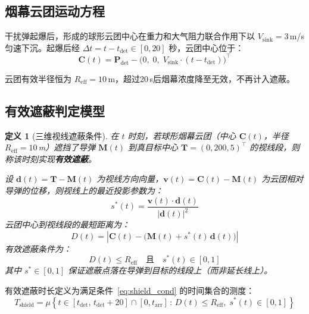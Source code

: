 \documentclass[12pt, a4paper]{article}
\newtheorem{definition}{定义}
\begin{document}
\subsection{烟幕云团运动方程}

干扰弹起爆后，形成的球形云团中心在重力和大气阻力联合作用下以 $V_{\mathrm{sink}}=3$\,m/s 匀速下沉。起爆后经 $\Delta t = t - t_{\mathrm{det}} \in [0,20]$ 秒，云团中心位于：
\begin{equation}
\boldsymbol{C}(t) = \boldsymbol{P}_{\mathrm{det}} - \big(0,\;0,\;V_{\mathrm{sink}}\cdot(t-t_{\mathrm{det}})\big)^{\top}
\label{eq:cloud}
\end{equation}

云团有效半径恒为 $R_{\mathrm{eff}}=10$\,m，超过20\,s后烟幕浓度降至无效，不再计入遮蔽。

\subsection{有效遮蔽判定模型}

\begin{definition}[三维视线遮蔽条件]
在 $t$ 时刻，若球形烟幕云团（中心 $\boldsymbol{C}(t)$，半径 $R_{\mathrm{eff}}=10$\,m）遮挡了导弹 $\boldsymbol{M}(t)$ 到真目标中心 $\boldsymbol{T}=(0,200,5)^{\top}$ 的视线段，则称该时刻实现\textbf{有效遮蔽}。

设 $\boldsymbol{d}(t) = \boldsymbol{T} - \boldsymbol{M}(t)$ 为视线方向向量，$\boldsymbol{v}(t) = \boldsymbol{C}(t) - \boldsymbol{M}(t)$ 为云团相对导弹的位移，则视线上的最近投影参数为：
\begin{equation}
s^*(t) = \frac{\boldsymbol{v}(t) \cdot \boldsymbol{d}(t)}{|\boldsymbol{d}(t)|^2}
\end{equation}
云团中心到视线段的最短距离为：
\begin{equation}
D(t) = \left|\boldsymbol{C}(t) - \Big(\boldsymbol{M}(t) + s^*(t)\,\boldsymbol{d}(t)\Big)\right|
\end{equation}
有效遮蔽条件为：
\begin{equation}
D(t) \le R_{\mathrm{eff}} \quad \text{且} \quad s^*(t) \in [0,1]
\label{eq:shield_cond}
\end{equation}
其中 $s^*\in[0,1]$ 保证遮蔽点落在导弹到目标的线段上（而非延长线上）。
\end{definition}

有效遮蔽时长定义为满足条件~\eqref{eq:shield_cond} 的时间集合的测度：
\begin{equation}
T_{\mathrm{shield}} = \mu\!\left\{t \in [t_{\mathrm{det}},\,t_{\mathrm{det}}+20]\cap[0,t_{\mathrm{arr}}]\,:\, D(t) \le R_{\mathrm{eff}},\;s^*(t)\in[0,1]\right\}
\end{equation}
\end{document}
